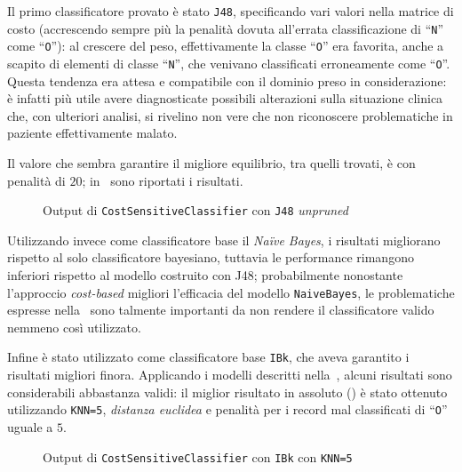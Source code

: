 Il primo classificatore provato è stato \texttt{J48}, specificando vari valori nella matrice di costo (accrescendo sempre più la penalità dovuta all'errata classificazione di ``\texttt{N}'' come ``\texttt{O}''):
al crescere del peso, effettivamente la classe ``\texttt{O}'' era favorita, anche a scapito di elementi di classe ``\texttt{N}'', che venivano classificati erroneamente come ``\texttt{O}''.
Questa tendenza era attesa e compatibile con il dominio preso in considerazione:
è infatti più utile avere diagnosticate possibili alterazioni sulla situazione clinica che, con ulteriori analisi, si rivelino non vere che non riconoscere problematiche in paziente effettivamente malato.

Il valore che sembra garantire il migliore equilibrio, tra quelli trovati, è con penalità di \(20\);
in~ sono riportati i risultati.

\begin{figure}[H]
  \centering
  \caption{Output di \texttt{CostSensitiveClassifier} con \texttt{J48} \emph{unpruned}}%
  \label{fig:cost:j48}
\end{figure}

Utilizzando invece come classificatore base il \emph{Naïve Bayes}, i risultati migliorano rispetto al solo classificatore bayesiano, tuttavia le performance rimangono inferiori rispetto al modello costruito con J48;
probabilmente nonostante l'approccio \emph{cost-based} migliori l'efficacia del modello \texttt{NaiveBayes}, le problematiche espresse nella~ sono talmente importanti da non rendere il classificatore valido nemmeno così utilizzato.

Infine è stato utilizzato come classificatore base \texttt{IBk}, che aveva garantito i risultati migliori finora.
Applicando i modelli descritti nella~, alcuni risultati sono considerabili abbastanza validi:
il miglior risultato in assoluto () è stato ottenuto utilizzando \texttt{KNN=5}, \emph{distanza euclidea} e penalità per i record mal classificati di ``\texttt{O}'' uguale a \(5\).

\begin{figure}[H]
  \centering
  \caption{Output di \texttt{CostSensitiveClassifier} con \texttt{IBk} con \texttt{KNN=5}}%
  \label{fig:cost:ibk5}
\end{figure}

